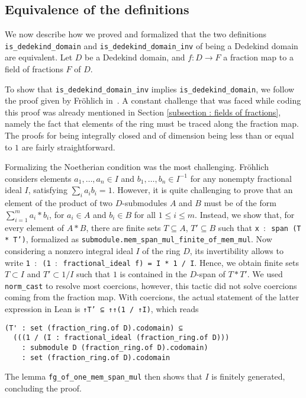 \documentclass[a4paper,USenglish,cleveref, autoref, thm-restate]{lipics-v2021}
\newcommand{\lean}[1]{\texttt{#1}\xspace} %
\begin{document}
\subsection{Equivalence of the definitions} \label{sec:equivalence}
We now describe how we proved and formalized that the two definitions \lean{is\_dedekind\_domain} and \lean{is\_dedekind\_domain\_inv} of being a Dedekind domain are equivalent. Let $D$ be a Dedekind domain, and $f\colon D\to F$ a fraction map to a field of fractions $F$ of $D$.

To show that \lean{is\_dedekind\_domain\_inv} implies \lean{is\_dedekind\_domain}, we follow the proof given by Fr\"ohlich in~\cite[Chapter 1, \S~2, ~Proposition 1.2.1]{frohlich}. A constant challenge that was faced while coding this proof was already mentioned in Section \ref{subsection : fields of fractions}, namely the fact that elements of the ring must be traced along the fraction map. %
The proofs for being integrally closed and of dimension being less than or equal to $1$ are fairly straightforward.

Formalizing the Noetherian condition was the most challenging. Fr\"ohlich considers elements $a_1, \dots, a_n \in I$ and $b_1, \dots, b_n \in I^{-1}$ for any nonempty fractional ideal $I$,
satisfying $ \sum_i a_i b_i = 1 $.
However, it is quite challenging to prove that an element of the product of two $D$-submodules $A$ and $B$ must be of the form $\sum_{i = 1}^m a_i*b_i$, for $a_i \in A$ and $b_i \in B$ for all $1 \leq i \leq m$.
Instead, we show that, for every element of $A\ast B$, there are finite sets $T\subseteq A$, $T'\subseteq B$ such that \lean{x $:$ span (T * T')}, formalized as %
\lean{submodule.mem\_span\_mul\_finite\_of\_mem\_mul}.
Now considering a nonzero integral ideal $I$ of the ring $D$, its invertibility allows to write \lean{1 $:$ (1 $:$ fractional\_ideal f) = I * 1 / I}. Hence, we obtain 
finite sets $T \subset I$ and $T' \subset 1/I$ such that $1$ is contained in the $D$-span of $T*T'$. We used \lean{norm\_cast} to resolve most coercions, however, this tactic did not solve coercions coming from the fraction map. With coercions, the actual statement of the latter expression in Lean is \lean{↑T' ⊆ ↑↑(1 / ↑I)}, which reads
\begin{lstlisting}
(T' : set (fraction_ring.of D).codomain) ⊆
  (((1 / (I : fractional_ideal (fraction_ring.of D)))
    : submodule D (fraction_ring.of D).codomain)
    : set (fraction_ring.of D).codomain
\end{lstlisting}
The lemma \lean{fg\_of\_one\_mem\_span\_mul} then shows that $I$ is finitely generated, concluding the proof.
\end{document}
